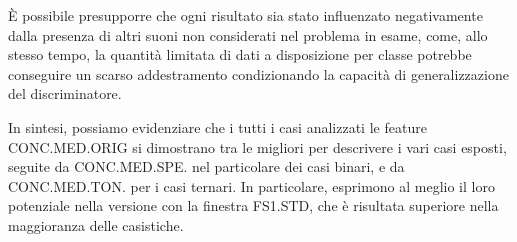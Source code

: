 È possibile presupporre che ogni risultato sia stato influenzato negativamente dalla presenza
di altri suoni non considerati nel problema in esame, come, allo stesso tempo, la quantità
limitata di dati a disposizione per classe potrebbe conseguire un scarso addestramento
condizionando la capacità di generalizzazione del discriminatore.

In sintesi, possiamo evidenziare che i tutti i casi analizzati le feature CONC.MED.ORIG si
dimostrano tra le migliori per descrivere i vari casi esposti, seguite da CONC.MED.SPE. nel
particolare dei casi binari, e da CONC.MED.TON. per i casi ternari. In particolare,
esprimono al meglio il loro potenziale nella versione con la finestra FS1.STD, che è risultata
superiore nella maggioranza delle casistiche.

\vspace{12pt}

